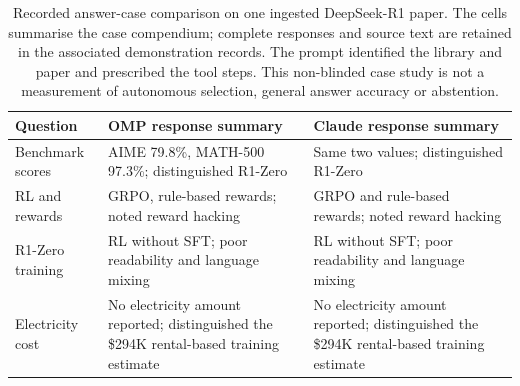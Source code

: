 \documentclass[final,5p,times,twocolumn]{elsarticle}
\begin{document}
\begin{table}[t]
\centering\small
\caption{Recorded answer-case comparison on one ingested DeepSeek-R1 paper.
The cells summarise the case compendium; complete responses and source text
are retained in the associated demonstration records. The prompt identified
the library and paper and prescribed the tool steps. This non-blinded case
study is not a measurement of autonomous selection, general answer accuracy or
abstention.}
\label{tab:s-answer-cases}
\begin{tabular}{@{}p{}p{}p{}@{}}
\toprule
Question & OMP response summary & Claude response summary \\
\midrule
Benchmark scores & AIME 79.8\%, MATH-500 97.3\%; distinguished R1-Zero & Same two values; distinguished R1-Zero \\
RL and rewards & GRPO, rule-based rewards; noted reward hacking & GRPO and rule-based rewards; noted reward hacking \\
R1-Zero training & RL without SFT; poor readability and language mixing & RL without SFT; poor readability and language mixing \\
Electricity cost & No electricity amount reported; distinguished the \$294K rental-based training estimate & No electricity amount reported; distinguished the \$294K rental-based training estimate \\
\bottomrule
\end{tabular}
\end{table}
\end{document}
